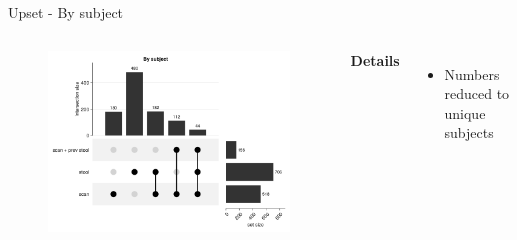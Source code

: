 \begin{frame}{Upset - By subject}
    \begin{columns}[c] %

    
        \begin{figure}
        \includegraphics[width=1\linewidth]{../figures/upset_scan_stool_bysybject.png}
        \end{figure}

    
        \textbf{Details}
        \begin{itemize}
            \item Numbers reduced to unique subjects
        \end{itemize}

    \end{columns}

\end{frame}

